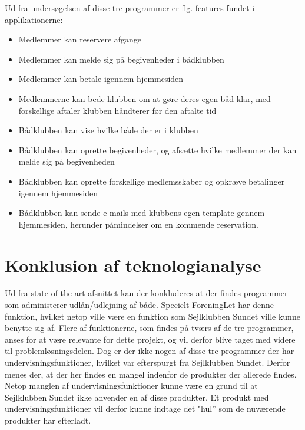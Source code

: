 Ud fra undersøgelsen af disse tre programmer er flg. features fundet i applikationerne:

\begin{itemize}
  \item Medlemmer kan reservere afgange
  \item Medlemmer kan melde sig på begivenheder i bådklubben
  \item Medlemmer kan betale igennem hjemmesiden
  \item Medlemmerne kan bede klubben om at gøre deres egen båd klar, med forskellige aftaler klubben håndterer
        før den aftalte tid
  \item Bådklubben kan vise hvilke både der er i klubben
  \item Bådklubben kan oprette begivenheder, og afsætte hvilke medlemmer der kan melde sig på begivenheden
  \item Bådklubben kan oprette forskellige medlemsskaber og opkræve betalinger igennem hjemmesiden
  \item Bådklubben kan sende e-mails med klubbens egen template gennem hjemmesiden, herunder påmindelser om en
        kommende reservation.
\end{itemize}
\section{Konklusion af teknologianalyse}

Ud fra state of the art afsnittet kan der konkluderes at der findes programmer som administerer udlån/udlejning af både.
Specielt ForeningLet har denne funktion, hvilket netop ville være en funktion som Sejlklubben Sundet ville kunne benytte sig af.
Flere af funktionerne, som findes på tværs af de tre programmer, anses for at være relevante for dette projekt, og vil derfor blive taget med videre til problemløsningsdelen.
Dog er der ikke nogen af disse tre programmer der har undervisningsfunktioner, hvilket var efterspurgt fra Sejlklubben Sundet. Derfor menes der, at der her findes en mangel indenfor de produkter der allerede findes.
Netop manglen af undervisningsfunktioner kunne være en grund til at Sejlklubben Sundet ikke anvender en af disse produkter.
Et produkt med undervisningsfunktioner vil derfor kunne indtage det "hul'' som de nuværende produkter har efterladt.

